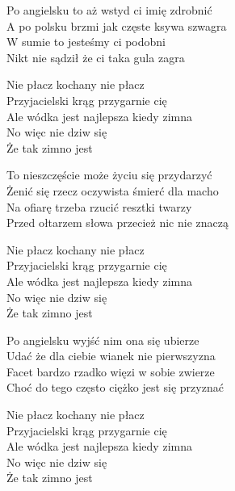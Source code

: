 \begin{text}
    Po angielsku to aż wstyd ci imię zdrobnić\\
    A po polsku brzmi jak częste ksywa szwagra\\
    W sumie to jesteśmy ci podobni\\
    Nikt nie sądził że ci taka gula zagra

    Nie płacz kochany nie płacz\\
    Przyjacielski krąg przygarnie cię\\
    Ale wódka jest najlepsza kiedy zimna\\
    No więc nie dziw się\\
    Że tak zimno jest

    To nieszczęście może życiu się przydarzyć\\
    Żenić się rzecz oczywista śmierć dla macho\\
    Na ofiarę trzeba rzucić resztki twarzy\\
    Przed ołtarzem słowa przecież nic nie znaczą

    Nie płacz kochany nie płacz\\
    Przyjacielski krąg przygarnie cię\\
    Ale wódka jest najlepsza kiedy zimna\\
    No więc nie dziw się\\
    Że tak zimno jest

    Po angielsku wyjść nim ona się ubierze\\
    Udać że dla ciebie wianek nie pierwszyzna\\
    Facet bardzo rzadko więzi w sobie zwierze\\
    Choć do tego często ciężko jest się przyznać

    Nie płacz kochany nie płacz\\
    Przyjacielski krąg przygarnie cię\\
    Ale wódka jest najlepsza kiedy zimna\\
    No więc nie dziw się\\
    Że tak zimno jest
\end{text}
\begin{chord}

\end{chord}